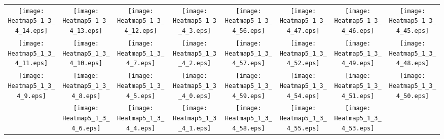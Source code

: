 \documentclass{standalone}
\begin{document}
\begin{tabular}{ *8{c} }
\texttt{[image: Heatmap5\_1\_3\_4\_14.eps]} & \texttt{[image: Heatmap5\_1\_3\_4\_13.eps]} & \texttt{[image: Heatmap5\_1\_3\_4\_12.eps]} & \texttt{[image: Heatmap5\_1\_3\_4\_3.eps]} & \texttt{[image: Heatmap5\_1\_3\_4\_56.eps]} & \texttt{[image: Heatmap5\_1\_3\_4\_47.eps]} & \texttt{[image: Heatmap5\_1\_3\_4\_46.eps]} & \texttt{[image: Heatmap5\_1\_3\_4\_45.eps]} \\
\texttt{[image: Heatmap5\_1\_3\_4\_11.eps]} & \texttt{[image: Heatmap5\_1\_3\_4\_10.eps]} & \texttt{[image: Heatmap5\_1\_3\_4\_7.eps]} & \texttt{[image: Heatmap5\_1\_3\_4\_2.eps]} & \texttt{[image: Heatmap5\_1\_3\_4\_57.eps]} & \texttt{[image: Heatmap5\_1\_3\_4\_52.eps]} & \texttt{[image: Heatmap5\_1\_3\_4\_49.eps]} & \texttt{[image: Heatmap5\_1\_3\_4\_48.eps]} \\
\texttt{[image: Heatmap5\_1\_3\_4\_9.eps]} & \texttt{[image: Heatmap5\_1\_3\_4\_8.eps]} & \texttt{[image: Heatmap5\_1\_3\_4\_5.eps]} & \texttt{[image: Heatmap5\_1\_3\_4\_0.eps]} & \texttt{[image: Heatmap5\_1\_3\_4\_59.eps]} & \texttt{[image: Heatmap5\_1\_3\_4\_54.eps]} & \texttt{[image: Heatmap5\_1\_3\_4\_51.eps]} & \texttt{[image: Heatmap5\_1\_3\_4\_50.eps]} \\
 & \texttt{[image: Heatmap5\_1\_3\_4\_6.eps]} & \texttt{[image: Heatmap5\_1\_3\_4\_4.eps]} & \texttt{[image: Heatmap5\_1\_3\_4\_1.eps]} & \texttt{[image: Heatmap5\_1\_3\_4\_58.eps]} & \texttt{[image: Heatmap5\_1\_3\_4\_55.eps]} & \texttt{[image: Heatmap5\_1\_3\_4\_53.eps]} &  
\end{tabular}
\end{document}

